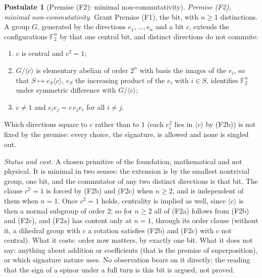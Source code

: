 \documentclass[11pt]{article}
\theoremstyle{definition}
\newtheorem{postulate}[theorem]{Postulate}
\theoremstyle{plain}
\newcommand{\changedmark}[2]{\marginpar{\raggedright\scriptsize\color{#1}#2}}
\begin{document}
\begin{postulate}[Premise (F2): minimal non-commutativity]\label{c:synthesis.premise-minimal-non-commutativity}
\changedmark{BurntOrange}{changed since the deposit}
\emph{Premise (F2), minimal non-commutativity.} Grant Premise (F1), the bit, with $n \ge 1$ distinctions. A group $G$, generated by the directions $e_{1}, \dots, e_{n}$ and a bit $c$, extends the configurations $\mathbb{F}_{2}^{n}$ by that one central bit, and distinct directions do not commute:
\begin{enumerate}
\item[(F2a)] $c$ is central and $c^{2} = 1$;
\item[(F2b)] $G/\langle c\rangle$ is elementary abelian of order $2^{n}$ with basis the images of the $e_{i}$, so that $S \mapsto e_{S}\langle c\rangle$, $e_{S}$ the increasing product of the $e_{i}$ with $i \in S$, identifies $\mathbb{F}_{2}^{n}$ under symmetric difference with $G/\langle c\rangle$;
\item[(F2c)] $c \ne 1$ and $e_{i}e_{j} = c\,e_{j}e_{i}$ for all $i \ne j$.
\end{enumerate}
Which directions square to $c$ rather than to $1$ (each $e_{i}^{2}$ lies in $\langle c\rangle$ by (F2b)) is not fixed by the premise: every choice, the signature, is allowed and none is singled out.

\emph{Status and cost.} A chosen primitive of the foundation, mathematical and not physical. It is minimal in two senses: the extension is by the smallest nontrivial group, one bit, and the commutator of any two distinct directions is that bit. The clause $c^{2} = 1$ is forced by (F2b) and (F2c) when $n \ge 2$, and is independent of them when $n = 1$. Once $c^{2} = 1$ holds, centrality is implied as well, since $\langle c\rangle$ is then a normal subgroup of order $2$; so for $n \ge 2$ all of (F2a) follows from (F2b) and (F2c), and (F2a) has content only at $n = 1$, through its order clause (without it, a dihedral group with $c$ a rotation satisfies (F2b) and (F2c) with $c$ not central). What it costs: order now matters, by exactly one bit. What it does not say: anything about addition or coefficients (that is the premise of superposition), or which signature nature uses. No observation bears on it directly; the reading that the sign of a spinor under a full turn is this bit is argued, not proved.
\end{postulate}
\end{document}
